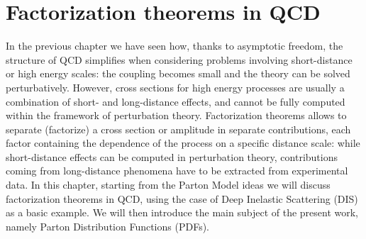 \chapter{Factorization theorems in QCD}
\label{ch:fact}
In the previous chapter we have seen how, thanks to asymptotic freedom, the structure of QCD simplifies when considering problems
involving short-distance or high energy scales: the coupling becomes small and the theory can be solved perturbatively.
However, cross sections for high energy processes are usually a combination of short- and long-distance effects, and cannot
be fully computed within the framework of perturbation theory. Factorization theorems allows to separate (factorize) a cross section
or amplitude in separate contributions, each factor containing the dependence of the process on a specific distance scale:
while short-distance effects can be computed in perturbation theory, contributions coming from long-distance phenomena have
to be extracted from experimental data. 
In this chapter, starting from the Parton Model ideas we will discuss factorization theorems in QCD,
using the case of Deep Inelastic Scattering (DIS) as a basic example. We will then introduce the main subject of the
present work, namely Parton Distribution Functions (PDFs).

